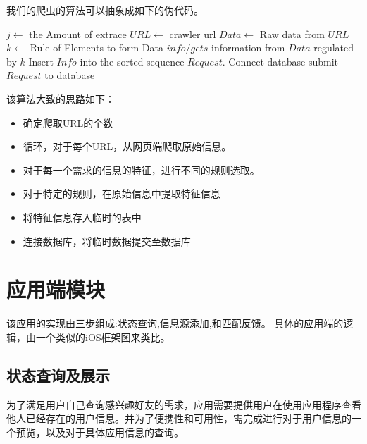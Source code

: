 我们的爬虫的算法可以抽象成如下的伪代码。

\begin{codebox}
\li \For $j \gets $ \To the Amount of extrace \label{li:for}
\li     \Do \label{li:for-begin}
\li 	$URL \gets$ crawler url 
\li 	$Data \gets$ Raw data from $URL$
\li 	\For $k \gets$ Rule of Elements to form Data \label{li:for}
\li     	\Do \label{li:for-begin}
\li 		$info /gets$ information from $Data$ regulated by $k$
\li      	Insert $Info$ into the sorted sequence $Request$.
\label{li:for-end}
                \End
\li         Connect database submit $Request$ to database       \label{li:for-end}
        \End
\end{codebox}

该算法大致的思路如下：
\begin{itemize}
\item 确定爬取URL的个数
\item 循环，对于每个URL，从网页端爬取原始信息。
\item 对于每一个需求的信息的特征，进行不同的规则选取。
\item 对于特定的规则，在原始信息中提取特征信息
\item 将特征信息存入临时的表中
\item 连接数据库，将临时数据提交至数据库
\end{itemize}


\section{应用端模块}
该应用的实现由三步组成:状态查询,信息源添加,和匹配反馈。
具体的应用端的逻辑，由一个类似的iOS框架图来类比。

\subsection{状态查询及展示}
为了满足用户自己查询感兴趣好友的需求，应用需要提供用户在使⽤应⽤程序查看他人已经存在的用户信息。并为了便携性和可用性，需完成进行对于用户信息的一个预览，以及对于具体应用信息的查询。

